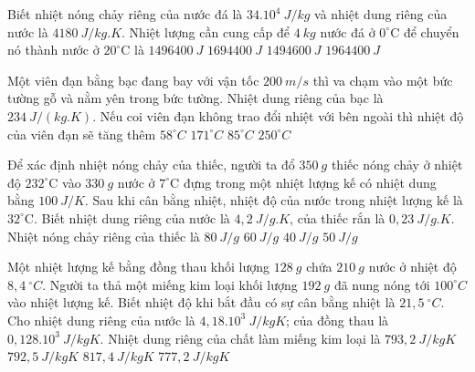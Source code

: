 \begin{ex}%
	Biết nhiệt nóng chảy riêng của nước đá là $34.10^4\ J/kg$ và nhiệt dung riêng của nước là $4180\ J/kg.K$. Nhiệt lượng cần cung cấp để $4\ kg$ nước đá ở $0^\circ\text{C}$ để chuyển nó thành nước ở $20^\circ\text{C}$ là
	\choice
	{$1496400\ J$}
	{\True $1694400\ J$}
	{$1494600\ J$}
	{$1964400\ J$}
\end{ex}

\begin{ex}%
	Một viên đạn bằng bạc đang bay với vận tốc $200\ m/s$ thì va chạm vào một bức tường gỗ và nằm yên trong bức tường. Nhiệt dung riêng của bạc là $234\ J/(kg.K)$. Nếu coi viên đạn không trao đổi nhiệt với bên ngoài thì nhiệt độ của viên đạn sẽ tăng thêm 
	\choice
	{$58^\circ C$}
	{$171^\circ C$}
	{\True $85^\circ C$}
	{$250^\circ C$}
\end{ex}

\begin{ex}%
	Để xác định nhiệt nóng chảy của thiếc, người ta đổ $350\ g$ thiếc nóng chảy ở nhiệt độ $232^\circ\text{C}$ vào $330\ g$ nước ở $7^\circ\text{C}$ đựng trong một nhiệt lượng kế có nhiệt dung bằng $100\ J/K$. Sau khi cân bằng nhiệt, nhiệt độ của nước trong nhiệt lượng kế là $32^\circ\text{C}$. Biết nhiệt dung riêng của nước là $4,2\ J/g.K$, của thiếc rắn là $0,23\ J/g.K$. Nhiệt nóng chảy riêng của thiếc là
	\choice
	{$80\ J/g$}
	{\True $60\ J/g$}
	{$40\ J/g$}
	{$50\ J/g$}
\end{ex}
\begin{ex}%
	Một nhiệt lượng kế bằng đồng thau khối lượng $128\ g$ chứa $210\ g$ nước ở nhiệt độ $8,4\ ^\circ C$. Người ta thả một miếng kim loại khối lượng $192\ g$ đã nung nóng tới $100^\circ C$ vào nhiệt lượng kế. Biết nhiệt độ khi bắt đầu có sự cân bằng nhiệt là $21,5\ ^\circ C$. Cho nhiệt dung riêng của nước là $4,18.10^3\ J/kgK$; của đồng thau là $0,128.10^3\ J/kgK$. Nhiệt dung riêng của chất làm miếng kim loại là
	\choice
	{$793,2\ J/kgK$}
	{$792,5\ J/kgK$}
	{$817,4\ J/kgK$}
	{\True $777,2\ J/kgK$}
\end{ex}
